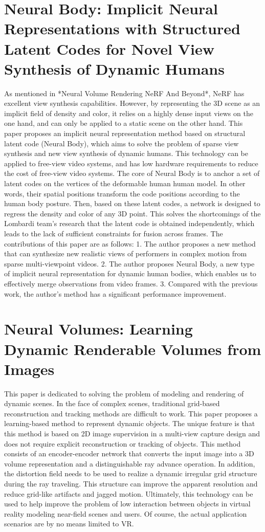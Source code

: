 \documentclass[UTF-8]{ctexart}
\begin{document}
\section{Neural Body: Implicit Neural Representations with Structured Latent Codes for Novel View Synthesis of Dynamic Humans}
As mentioned in *Neural Volume Rendering NeRF And Beyond*, NeRF has excellent view synthesis capabilities. However, by representing the 3D scene as an implicit field of density and color, it relies on a highly dense input views on the one hand, and can only be applied to a static scene on the other hand. This paper proposes an implicit neural representation method based on structural latent code (Neural Body), which aims to solve the problem of sparse view synthesis and new view synthesis of dynamic humans. This technology can be applied to free-view video systems, and has low hardware requirements to reduce the cost of free-view video systems. The core of Neural Body is to anchor a set of latent codes on the vertices of the deformable human human model. In other words, their spatial positions transform the code positions according to the human body posture. Then, based on these latent codes, a network is designed to regress the density and color of any 3D point. This solves the shortcomings of the Lombardi team's research that the latent code is obtained independently, which leads to the lack of sufficient constraints for fusion across frames. The contributions of this paper are as follows: 1. The author proposes a new method that can synthesize new realistic views of performers in complex motion from sparse multi-viewpoint videos. 2. The author proposes Neural Body, a new type of implicit neural representation for dynamic human bodies, which enables us to effectively merge observations from video frames. 3. Compared with the previous work, the author's method has a significant performance improvement.

\section{Neural Volumes: Learning Dynamic Renderable Volumes from Images}
This paper is dedicated to solving the problem of modeling and rendering of dynamic scenes. In the face of complex scenes, traditional grid-based reconstruction and tracking methods are difficult to work. This paper proposes a learning-based method to represent dynamic objects. The unique feature is that this method is based on 2D image supervision in a multi-view capture design and does not require explicit reconstruction or tracking of objects. This method consists of an encoder-encoder network that converts the input image into a 3D volume representation and a distinguishable ray advance operation. In addition, the distortion field needs to be used to realize a dynamic irregular grid structure during the ray traveling. This structure can improve the apparent resolution and reduce grid-like artifacts and jagged motion. Ultimately, this technology can be used to help improve the problem of low interaction between objects in virtual reality modeling near-field scenes and users. Of course, the actual application scenarios are by no means limited to VR.
\end{document}
